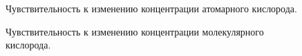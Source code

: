 \documentclass[14pt, a4paper, fleqn]{extarticle}
\begin{document}
\begin{figure}
\caption{Чувствительность к изменению концентрации атомарного кислорода.}
\end{figure}

\begin{figure}
\caption{Чувствительность к изменению концентрации молекулярного кислорода.}
\end{figure}
\end{document}
